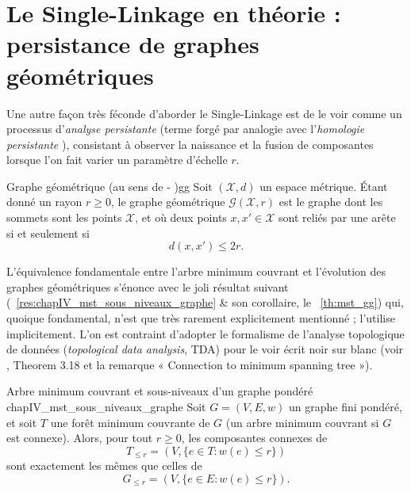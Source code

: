 \section{Le Single-Linkage en théorie : persistance de graphes géométriques}

Une autre façon très féconde d'aborder le Single-Linkage est de le voir comme un processus d'\emph{analyse persistante} (terme forgé par analogie avec l'\emph{homologie persistante} \cite{BobrowskiKahle}), consistant à observer la naissance et la fusion de composantes lorsque l'on fait varier un paramètre d'échelle $r$.

\begin{Definition}{Graphe géométrique (au sens de - \cite{Gilbert1961, penrose2003})}{gg}
Soit $(\mathcal X, d)$ un espace métrique. Étant donné un rayon $r \ge 0$, le graphe géométrique $\mathcal{G}(\mathcal{X}, r)$ est le graphe dont les sommets sont les points $\mathcal{X}$, et où deux points $x, x' \in \mathcal{X}$ sont reliés par une arête si et seulement si \[
d(x , x')\le 2r.
\]
\end{Definition}

L'équivalence fondamentale entre l'arbre minimum couvrant et l'évolution des graphes géométriques s'énonce avec le joli résultat suivant (\Res~\ref{res:chapIV_mst_sous_niveaux_graphe} \& son corollaire, le \Th~\ref{th:mst_gg}) qui, quoique fondamental, n'est que très rarement explicitement mentionné ;  \cite{penrose2003} l'utilise implicitement. 
L'on est contraint d'adopter le formalisme de l'analyse topologique de données (\emph{topological data analysis}, TDA) pour le voir écrit noir sur blanc (voir \cite{DeyWang2022}, Theorem 3.18 et la remarque « Connection to minimum spanning tree »).




\begin{Resultat}{Arbre minimum couvrant et sous-niveaux d'un graphe pondéré \cite{Kruskal1956, Prim1957}}{chapIV_mst_sous_niveaux_graphe}
Soit $G=(V,E,w)$ un graphe fini pondéré, et soit $T$ une forêt minimum couvrante de $G$ (un arbre minimum couvrant si $G$ est connexe). Alors, pour tout $r\ge0$, les composantes connexes de
\[
    T_{\le r}=(V,\{e\in T:w(e)\le r\})
\]
sont exactement les mêmes que celles de
\[
    G_{\le r}=(V,\{e\in E:w(e)\le r\}).
\]
\end{Resultat}

